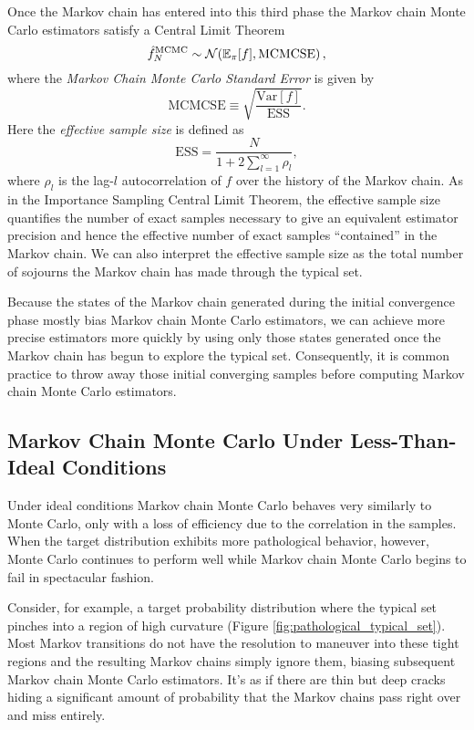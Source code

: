Once the Markov chain has entered into this third phase
the Markov chain Monte Carlo estimators satisfy a Central 
Limit Theorem
%
\begin{equation*}
\hat{f}_{N}^{\mathrm{MCMC}} \sim 
\mathcal{N} \! \left( \mathbb{E}_{\pi} [ f ],
\mathrm{MCMCSE} \right),
\end{equation*}
%
where the \emph{Markov Chain Monte Carlo Standard Error} is 
given by
%
\begin{equation*}
\mathrm{MCMCSE} \equiv \sqrt{ \frac{ \mathrm{Var} [ f ] }{\mathrm{ESS} } }.
\end{equation*}
%
Here the \emph{effective sample size} is defined as
%
\begin{equation*}
\mathrm{ESS} = 
\frac{N}
{ 1 + 2 \sum_{l = 1}^{\infty} \rho_{l} },
\end{equation*}
%
where $\rho_{l}$ is the lag-$l$ autocorrelation of $f$ over the history
of the Markov chain.  As in the Importance Sampling Central Limit 
Theorem, the effective sample size quantifies the number of exact 
samples necessary to give an equivalent estimator precision and 
hence the effective number of exact samples ``contained'' in the 
Markov chain.  We can also interpret the effective sample size as 
the total number of sojourns the Markov chain has made through 
the typical set.

Because the states of the Markov chain generated during the initial 
convergence phase mostly bias Markov chain Monte Carlo estimators, 
we can achieve more precise estimators more quickly by using only
those states generated once the Markov chain has begun to explore the
typical set.  Consequently, it is common practice to throw away those
initial converging samples before computing Markov chain Monte
Carlo estimators.

\subsection{Markov Chain Monte Carlo Under Less-Than-Ideal Conditions}

Under ideal conditions Markov chain Monte Carlo behaves
very similarly to Monte Carlo, only with a loss of efficiency due
to the correlation in the samples.  When the target distribution
exhibits more pathological behavior, however, Monte Carlo
continues to perform well while Markov chain Monte Carlo
begins to fail in spectacular fashion.

Consider, for example, a target probability distribution where
the typical set pinches into a region of high curvature
(Figure \ref{fig:pathological_typical_set}).  Most Markov
transitions do not have the resolution to maneuver into
these tight regions and the resulting Markov chains simply
ignore them, biasing subsequent Markov chain Monte Carlo
estimators.  It's as if there are thin but deep cracks hiding 
a significant amount of probability that the Markov chains 
pass right over and miss entirely.

